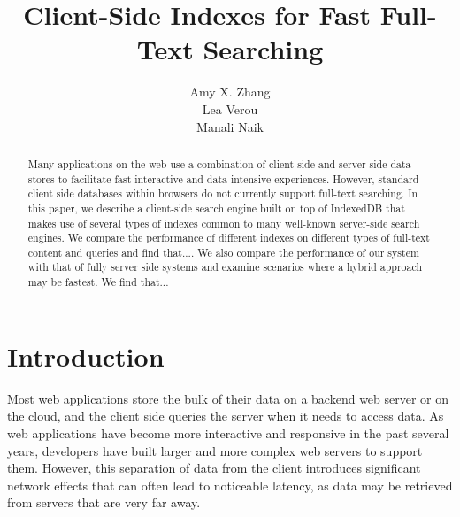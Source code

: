 \documentclass{vldb}
\begin{document}

\title{Client-Side Indexes for Fast Full-Text Searching}




\author{
\alignauthor
Amy X. Zhang\\
\alignauthor Lea Verou\\
\alignauthor Manali Naik\\
}

\maketitle

\begin{abstract}

Many applications on the web use a combination of client-side and server-side data stores to facilitate fast interactive and data-intensive experiences. 
However, standard client side databases within browsers do not currently support full-text searching. 
In this paper, we describe a client-side search engine built on top of IndexedDB that makes use of several types of indexes common to many well-known server-side search engines.
We compare the performance of different indexes on different types of full-text content and queries and find that....
We also compare the performance of our system with that of fully server side systems and examine scenarios where a hybrid approach may be fastest. We find that...

\end{abstract}

\section{Introduction}

Most web applications store the bulk of their data on a backend web server or on the cloud, and the client side queries the server when it needs to access data.
As web applications have become more interactive and responsive in the past several years, developers have built larger and more complex web servers to support them. However, this separation of data from the client introduces significant network effects that can often lead to noticeable latency, as data may be retrieved from servers that are very far away. 
\end{document}
